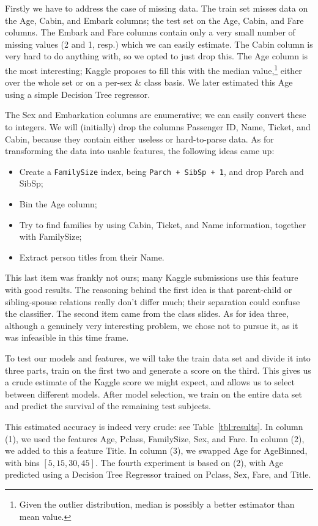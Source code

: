 \documentclass[runningheads,a4paper]{llncs}
\begin{document}
Firstly we have to address the case of missing data.  The train set misses data on the Age, Cabin, and Embark columns; the test set on the Age, Cabin, and Fare columns.  The Embark and Fare columns contain only a very small number of missing values (2 and 1, resp.) which we can easily estimate.  The Cabin column is very hard to do anything with, so we opted to just drop this.  The Age column is the most interesting; Kaggle proposes to fill this with the median value,\footnote{Given the outlier distribution, median is possibly a better estimator than mean value.} either over the whole set or on a per-sex \& class basis.  We later estimated this Age using a simple Decision Tree regressor.

The Sex and Embarkation columns are enumerative; we can easily convert these to integers.  We will (initially) drop the columns Passenger ID, Name, Ticket, and Cabin, because they contain either useless or hard-to-parse data. As for transforming the data into usable features, the following ideas came up:
\begin{itemize}
	\item Create a \texttt{FamilySize} index, being \texttt{Parch + SibSp + 1}, and drop Parch and SibSp;
    \item Bin the Age column;
    \item Try to find families by using Cabin, Ticket, and Name information, together with FamilySize;
    \item Extract person titles from their Name.
\end{itemize}
This last item was frankly not ours; many Kaggle submissions use this feature with good results.  The reasoning behind the first idea is that parent-child or sibling-spouse relations really don't differ much; their separation could confuse the classifier.  The second item came from the class slides. As for idea three, although a genuinely very interesting problem, we chose not to pursue it, as it was infeasible in this time frame.

To test our models and features, we will take the train data set and divide it into three parts, train on the first two and generate a score on the third.  This gives us a crude estimate of the Kaggle score we might expect, and allows us to select between different models.  After model selection, we train on the entire data set and predict the survival of the remaining test subjects.  

This estimated accuracy is indeed very crude: see Table~\ref{tbl:results}.  In column (1), we used the features Age, Pclass, FamilySize, Sex, and Fare.  In column (2), we added to this a feature Title.  In column (3), we swapped Age for AgeBinned, with bins $[5, 15, 30, 45]$. The fourth experiment is based on (2), with Age predicted using a Decision Tree Regressor trained on Pclass, Sex, Fare, and Title.  
\end{document}

